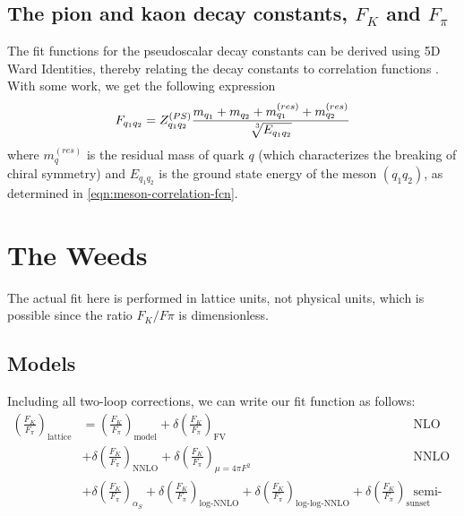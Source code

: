 \documentclass[prd,tightenlines,preprintnumbers,showpacs,superscriptaddress,notitlepage,eqsecnum,floatfix,notitlepage]{revtex4-1}
\begin{document}
\subsection{The pion and kaon decay constants, $F_K$ and $F_\pi$}
The fit functions for the pseudoscalar decay constants can be derived using 5D Ward Identities, thereby relating the decay constants to correlation functions \cite{Berkowitz:2017opd}. With some work, we get the following expression
\begin{equation}
F_{q_1 q_2} = Z^{(PS)}_{q_1 q_2}\frac{m_{q_1} + m_{q_2} + m^{(res)}_{q_1} + m^{(res)}_{q_2} }{\sqrt[\leftroot{-3}\uproot{3}3]{E_{q_1 q_2}}}
\end{equation}
where $m^{(res)}_q$ is the residual mass of quark $q$ (which characterizes the breaking of chiral symmetry) and $E_{q_1 q_2}$ is the ground state energy of the meson $(q_1 q_2)$, as determined in \eqref{eqn:meson-correlation-fcn}.



\section{The Weeds}
The actual fit here is performed in lattice units, not physical units, which is possible since the ratio $F_K / F\pi$ is dimensionless.

\subsection{Models} \label{section:models}
Including all two-loop corrections, we can write our fit function as follows:
\begin{align}
\left(\frac{F_K}{F_\pi}\right)_\text{lattice} &=
\left(\frac{F_K}{F_\pi}\right)_\text{model}  + \delta \left(\frac{F_K}{F_\pi}\right)_\text{FV} 
&& \text{NLO + F.V.} \\
&+ \delta \left(\frac{F_K}{F_\pi}\right)_\text{NNLO}  + \delta \left(\frac{F_K}{F_\pi}\right)_{\mu = 4 \pi F^2} 
&& \text{NNLO} \nonumber \\
&+ \delta\left(\frac{F_K}{F_\pi}\right)_{\alpha_S}
+ \delta\left(\frac{F_K}{F_\pi}\right)_{\text{log-NNLO}}
+ \delta\left(\frac{F_K}{F_\pi}\right)_{\text{log-log-NNLO}}
+ \delta\left(\frac{F_K}{F_\pi}\right)_{\text{sunset}} 
&& \text{semi-NNLO} \nonumber
\end{align}
\end{document}
